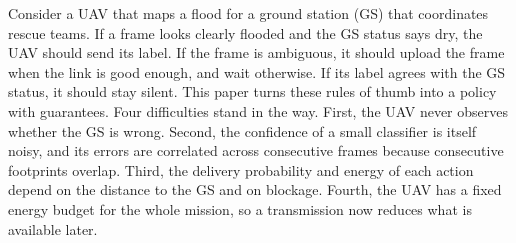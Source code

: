 \documentclass[journal]{IEEEtran}
\theoremstyle{remark}
\begin{document}
Consider a UAV that maps a flood for a ground station (GS) that coordinates rescue teams. If a frame looks clearly flooded and the GS status says dry, the UAV should send its label. If the frame is ambiguous, it should upload the frame when the link is good enough, and wait otherwise. If its label agrees with the GS status, it should stay silent. This paper turns these rules of thumb into a policy with guarantees. Four difficulties stand in the way. First, the UAV never observes whether the GS is wrong. Second, the confidence of a small classifier is itself noisy, and its errors are correlated across consecutive frames because consecutive footprints overlap. Third, the delivery probability and energy of each action depend on the distance to the GS and on blockage. Fourth, the UAV has a fixed energy budget for the whole mission, so a transmission now reduces what is available later.
\end{document}
